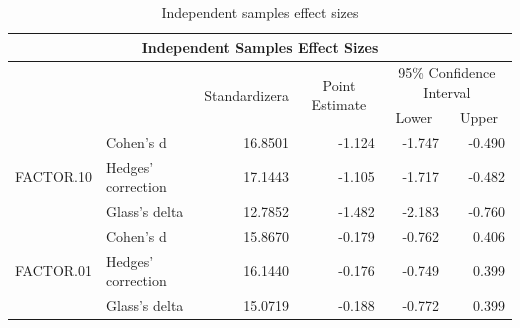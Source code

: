 \documentclass[a4paper]{article}
\begin{document}
\begin{table}[H]
\centering
\caption{Independent samples effect sizes}
\label{tab:effect-location}
\begin{tabular}{|l|l|r|r|r|r|} 
\hline
\multicolumn{6}{|c|}{Independent Samples Effect Sizes}                                                                                                                                                                  \\ 
\hline
                           &                    & \multicolumn{1}{c|}{\multirow{2}{*}{Standardizera}} & \multicolumn{1}{c|}{\multirow{2}{*}{Point Estimate}} & \multicolumn{2}{c|}{95\% Confidence Interval}            \\ 
\cline{1-2}\cline{5-6}
                           &                    & \multicolumn{1}{c|}{}                               & \multicolumn{1}{c|}{}                                & \multicolumn{1}{c|}{Lower} & \multicolumn{1}{c|}{Upper}  \\ 
\hline
\multirow{3}{*}{FACTOR.10} & Cohen's d          & 16.8501                                             & -1.124                                               & -1.747                     & -0.490                      \\ 
\cline{2-6}
                           & Hedges' correction & 17.1443                                             & -1.105                                               & -1.717                     & -0.482                      \\ 
\cline{2-6}
                           & Glass's delta      & 12.7852                                             & -1.482                                               & -2.183                     & -0.760                      \\ 
\hline
\multirow{3}{*}{FACTOR.01} & Cohen's d          & 15.8670                                             & -0.179                                               & -0.762                     & 0.406                       \\ 
\cline{2-6}
                           & Hedges' correction & 16.1440                                             & -0.176                                               & -0.749                     & 0.399                       \\ 
\cline{2-6}
                           & Glass's delta      & 15.0719                                             & -0.188                                               & -0.772                     & 0.399                       \\
\hline
\end{tabular}
\end{table}
\end{document}
